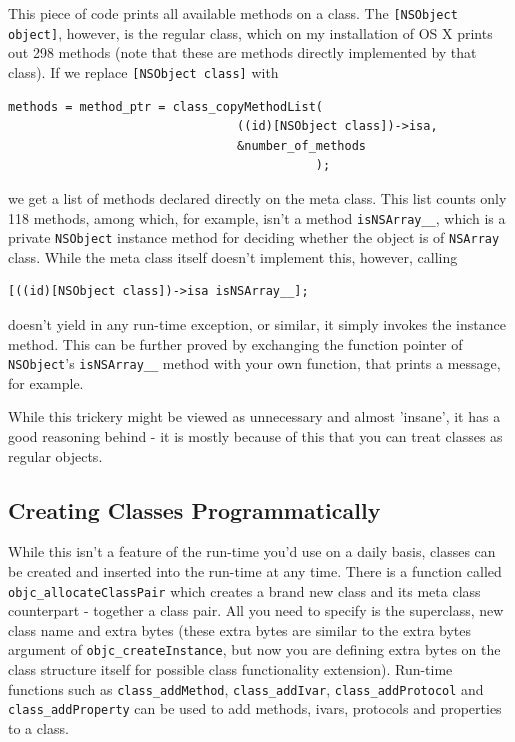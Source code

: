 This piece of code prints all available methods on a class. The \verb=[NSObject object]=, however, is the regular class, which on my installation of OS X prints out 298 methods (note that these are methods directly implemented by that class). If we replace \verb=[NSObject class]= with

\begin{verbatim}
methods = method_ptr = class_copyMethodList(
                                ((id)[NSObject class])->isa, 
                                &number_of_methods
                                           );
\end{verbatim}

we get a list of methods declared directly on the meta class. This list counts only 118 methods, among which, for example, isn't a method \verb=isNSArray__=, which is a private \verb=NSObject= instance method for deciding whether the object is of \verb=NSArray= class. While the meta class itself doesn't implement this, however, calling

\begin{verbatim}
[((id)[NSObject class])->isa isNSArray__];
\end{verbatim}

doesn't yield in any run-time exception, or similar, it simply invokes the instance method. This can be further proved by exchanging the function pointer of \verb=NSObject='s \verb=isNSArray__= method with your own function, that prints a message, for example.

While this trickery might be viewed as unnecessary and almost 'insane', it has a good reasoning behind - it is mostly because of this that you can treat classes as regular objects.

\subsection{Creating Classes Programmatically}

While this isn't a feature of the run-time you'd use on a daily basis, classes can be created and inserted into the run-time at any time. There is a function called \verb=objc_allocateClassPair= which creates a brand new class and its meta class counterpart - together a class pair. All you need to specify is the superclass, new class name and extra bytes (these extra bytes are similar to the extra bytes argument of \verb=objc_createInstance=, but now you are defining extra bytes on the class structure itself for possible class functionality extension). Run-time functions such as \verb=class_addMethod=, \verb=class_addIvar=, \verb=class_addProtocol= and \verb=class_addProperty= can be used to add methods, ivars, protocols and properties to a class.

